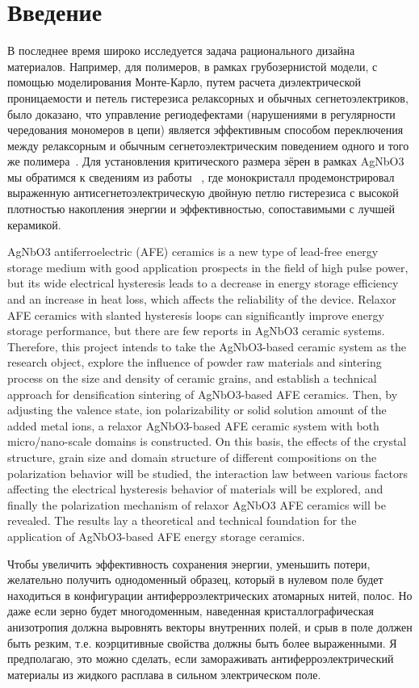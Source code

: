 \documentclass{WileyMSP-template}
\begin{document}
\section{Введение}

В последнее время широко исследуется задача рационального дизайна материалов. Например, для полимеров, в рамках грубозернистой модели, с помощью моделирования Монте-Карло, путем расчета диэлектрической проницаемости и петель гистерезиса релаксорных и обычных сегнетоэлектриков, было доказано, что управление региодефектами (нарушениями в регулярности чередования мономеров в цепи) является эффективным способом переключения между релаксорным и обычным сегнетоэлектрическим поведением одного и того же полимера~\cite{guan2025monte}. Для установления критического размера зёрен в рамках AgNbO3 мы обратимся к сведениям из работы ~\cite{zhao2024growth}, где монокристалл продемонстрировал выраженную антисегнетоэлектрическую двойную петлю гистерезиса с высокой плотностью накопления энергии и эффективностью, сопоставимыми с лучшей керамикой.

AgNbO3 antiferroelectric (AFE) ceramics is a new type of lead-free energy storage medium with good application prospects in the field of high pulse power, but its wide electrical hysteresis leads to a decrease in energy storage efficiency and an increase in heat loss, which affects the reliability of the device. Relaxor AFE ceramics with slanted hysteresis loops can significantly improve energy storage performance, but there are few reports in AgNbO3 ceramic systems. Therefore, this project intends to take the AgNbO3-based ceramic system as the research object, explore the influence of powder raw materials and sintering process on the size and density of ceramic grains, and establish a technical approach for densification sintering of AgNbO3-based AFE ceramics. Then, by adjusting the valence state, ion polarizability or solid solution amount of the added metal ions, a relaxor AgNbO3-based AFE ceramic system with both micro/nano-scale domains is constructed. On this basis, the effects of the crystal structure, grain size and domain structure of different compositions on the polarization behavior will be studied, the interaction law between various factors affecting the electrical hysteresis behavior of materials will be explored, and finally the polarization mechanism of relaxor AgNbO3 AFE ceramics will be revealed. The results lay a theoretical and technical foundation for the application of AgNbO3-based AFE energy storage ceramics.

Чтобы увеличить эффективность сохранения энергии, уменьшить потери, желательно получить однодоменный образец, который в нулевом поле будет находиться в конфигурации антиферроэлектрических атомарных нитей, полос. Но даже если зерно будет многодоменным, наведенная кристаллографическая анизотропия должна выровнять векторы внутренних полей, и срыв в поле должен быть резким, т.е. коэрцитивные свойства должны быть более выраженными. Я предполагаю, это можно сделать, если замораживать антиферроэлектрический материалы из жидкого расплава в сильном электрическом  поле. 
\end{document}
